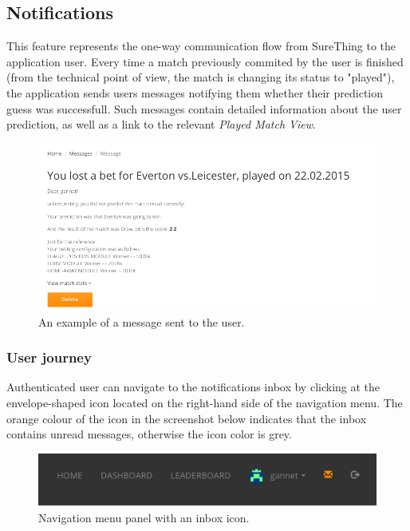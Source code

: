 \subsection{Notifications}
\label{subsec:notifications}
This feature represents the one-way communication flow from SureThing to the application user. Every time a match previously commited by the user is finished (from the technical point of view, the match is changing its status to "played"), the application sends users messages notifying them whether their prediction guess was successfull. Such messages contain detailed information about the user prediction, as well as a link to the relevant \emph{Played Match View}.

\begin{figure}[H]
	\begin{center}
		\includegraphics[width=.90\linewidth,natwidth=610,natheight=642]{impl/images/message}
		\caption{An example of a message sent to the user.} \label{fig:using: message}
	\end{center}
\end{figure}

\subsubsection*{User journey}
\label{subsec:notificationsuserjourney}
Authenticated user can navigate to the notifications inbox by clicking at the envelope-shaped icon located on the right-hand side of the navigation menu. The orange colour of the icon in the screenshot below indicates that the inbox contains unread messages, otherwise the icon color is grey.

\begin{figure}[H]
	\begin{center}
		\includegraphics[width=.60\linewidth,natwidth=610,natheight=642]{impl/images/navigationMenu}
		\caption{Navigation menu panel with an inbox icon.} \label{fig:using: navigationmenu}
	\end{center}
\end{figure}

